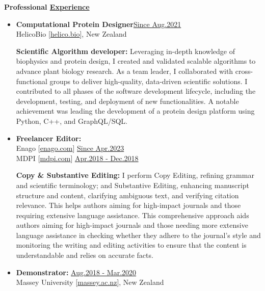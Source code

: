 
{\bf\Large Professional \href{.}{Experience}}

\begin{itemize}


    \item {\bf Computational Protein Designer}\hfill \href{.}{Since Aug.2021}\\
          HelicoBio [\href{www.helico.bio}{helico.bio}],
          New Zealand

              {\noindent
                  \textbf{Scientific Algorithm developer:}
                  Leveraging in-depth knowledge of biophysics and protein design, I created and validated scalable algorithms to advance plant biology research. As a team leader, I collaborated with cross-functional groups to deliver high-quality, data-driven scientific solutions. I contributed to all phases of the software development lifecycle, including the development, testing, and deployment of new functionalities. A notable achievement was leading the development of a protein design platform using Python, C++, and GraphQL/SQL.
              }

    \item {\bf Freelancer Editor:}\\
          Enago [\href{https://www.enago.com/}{enago.com}] \hfill
          \href{.}{Since Apr.2023}\\
          MDPI [\href{https://www.mdpi.com/}{mdpi.com}] \hfill
          \href{.}{Apr.2018 - Dec.2018}

          {\noindent
              \textbf{Copy \& Substantive Editing:}
              I perform Copy Editing, refining grammar and scientific terminology; and Substantive Editing, enhancing manuscript structure and content, clarifying ambiguous text, and verifying citation relevance. This helps authors aiming for high-impact journals and those requiring extensive language assistance. This comprehensive approach aids authors aiming for high-impact journals and those needing more extensive language assistance in checking whether they adhere to the journal's style and monitoring the writing and editing activities to ensure that the content is understandable and relies on accurate facts.
          }

    \item {\bf Demonstrator:} \hfill \href{.}{Aug.2018 - Mar.2020}\\
          Massey University [\href{www.massey.ac.nz}{massey.ac.nz}],
          New Zealand


\end{itemize}
